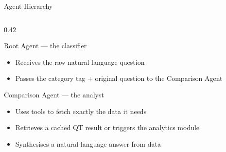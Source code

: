 \documentclass[aspectratio=169,10pt]{beamer}
\begin{document}
\begin{frame}[t]{Agent Hierarchy}
\begin{columns}[T]
\begin{column}{0.42\textwidth}
\begin{block}{Root Agent — the classifier}
\begin{itemize}
        \item Receives the raw natural language question
        \item Passes the category tag + original question
              to the Comparison Agent
      \end{itemize}
    \end{block}
    \begin{block}{Comparison Agent — the analyst}
      \begin{itemize}\setlength\itemsep{3pt}
        \item Uses tools to fetch exactly the
              data it needs
        \item Retrieves a cached QT result or
              triggers the analytics module
        \item Synthesises a natural language answer from data
      \end{itemize}
    \end{block}
  \end{column}
\end{columns}
\end{frame}
\end{document}
